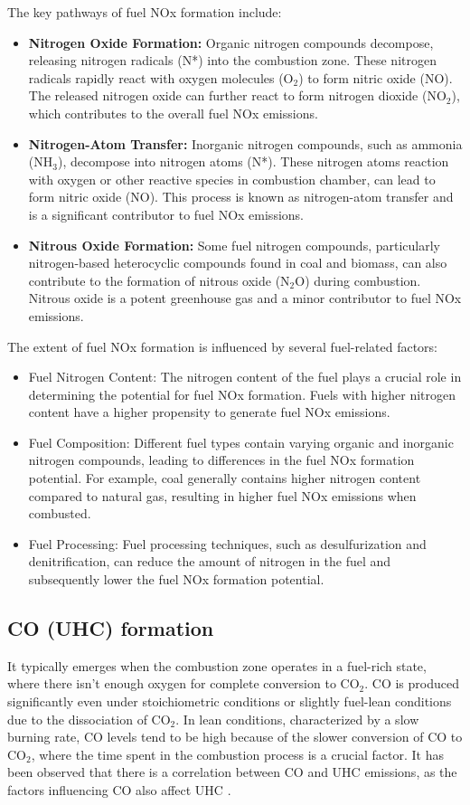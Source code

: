 The key pathways of fuel NOx formation include:
\begin{itemize}
    \item \textbf{Nitrogen Oxide Formation:} Organic nitrogen compounds decompose, releasing nitrogen radicals (N*) into the combustion zone. These nitrogen radicals rapidly react with oxygen molecules (O$_2$) to form nitric oxide (NO). The released nitrogen oxide can further react to form nitrogen dioxide (NO$_2$), which contributes to the overall fuel NOx emissions.
    \item \textbf{Nitrogen-Atom Transfer:} Inorganic nitrogen compounds, such as ammonia (NH$_3$), decompose into nitrogen atoms (N*). These nitrogen atoms reaction with oxygen or other reactive species in combustion chamber, can lead to form nitric oxide (NO). This process is known as nitrogen-atom transfer and is a significant contributor to fuel NOx emissions.
    \item \textbf{Nitrous Oxide Formation:} Some fuel nitrogen compounds, particularly nitrogen-based heterocyclic compounds found in coal and biomass, can also contribute to the formation of nitrous oxide (N$_2$O) during combustion. Nitrous oxide is a potent greenhouse gas and a minor contributor to fuel NOx emissions.
\end{itemize}

The extent of fuel NOx formation is influenced by several fuel-related factors:
\begin{itemize}
    \item Fuel Nitrogen Content: The nitrogen content of the fuel plays a crucial role in determining the potential for fuel NOx formation. Fuels with higher nitrogen content have a higher propensity to generate fuel NOx emissions.
    \item Fuel Composition: Different fuel types contain varying organic and inorganic nitrogen compounds, leading to differences in the fuel NOx formation potential. For example, coal generally contains higher nitrogen content compared to natural gas, resulting in higher fuel NOx emissions when combusted.
    \item Fuel Processing: Fuel processing techniques, such as desulfurization and denitrification, can reduce the amount of nitrogen in the fuel and subsequently lower the fuel NOx formation potential.
\end{itemize}

\subsection{CO (UHC) formation}
It typically emerges when the combustion zone operates in a fuel-rich state, where there isn't enough oxygen for complete conversion to CO$_2$. CO is produced significantly even under stoichiometric conditions or slightly fuel-lean conditions due to the dissociation of CO$_2$. In lean conditions, characterized by a slow burning rate, CO levels tend to be high because of the slower conversion of CO to CO$_2$, where the time spent in the combustion process is a crucial factor. It has been observed that there is a correlation between CO and UHC emissions, as the factors influencing CO also affect UHC \cite{LAH2010}.

